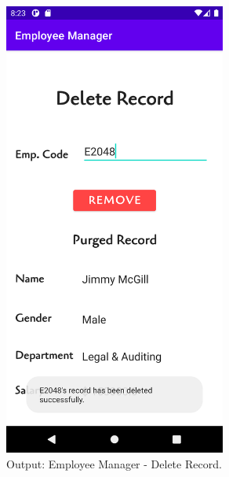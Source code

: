 \documentclass[12pt, a4]{article}
\begin{document}
\subsection*{}
\begin{figure}[h]
\centering
\caption{Output: Employee Manager - Delete Record.}
\includegraphics[height=15cm, width=7.3cm]{EmployeeManager/Screenshots/Output-6.png}
\end{figure}

\newpage
\end{document}
